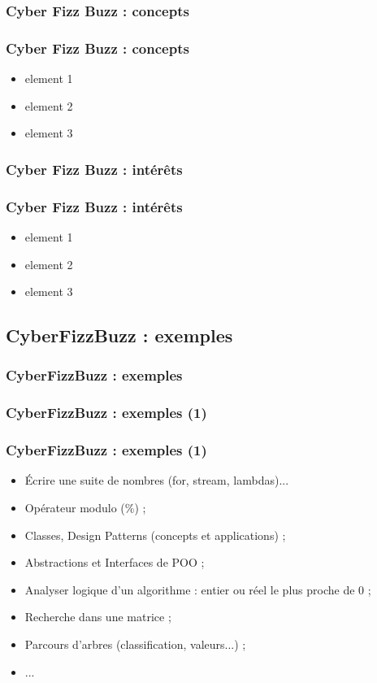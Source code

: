\documentclass[slidetop,11pt]{beamer}
\begin{document}
\subsubsection{Cyber Fizz Buzz : concepts}
\begin{frame}
	\frametitle{Cyber Fizz Buzz : concepts}
	\begin{itemize}
		\item element 1
		\item element 2
		\item element 3
	\end{itemize}
\end{frame} 

\subsubsection{Cyber Fizz Buzz : int{\'e}r{\^e}ts}
\begin{frame}
	\frametitle{Cyber Fizz Buzz : int{\'e}r{\^e}ts}
	\begin{itemize}
		\item element 1
		\item element 2
		\item element 3
	\end{itemize}
\end{frame} 

\subsection{CyberFizzBuzz : exemples}
\begin{frame}
	\frametitle{CyberFizzBuzz : exemples}
	\tableofcontents[sections=1,currentsection,subsectionstyle=show/shaded/hide]
\end{frame} 

\subsubsection{CyberFizzBuzz : exemples (1)}
\begin{frame}
	\frametitle{CyberFizzBuzz : exemples (1)}
	\begin{itemize}
		\item {\'E}crire une suite de nombres (for, stream, lambdas)...
		\item Op{\'e}rateur modulo (\%) ; 
		\item Classes, Design Patterns (concepts et applications) ; 
		\item Abstractions et Interfaces de POO ; 
		\item Analyser logique d'un algorithme : entier ou r{\'e}el le plus proche de 0 ; 
		\item Recherche dans une matrice ; 
		\item Parcours d'arbres (classification, valeurs...) ; 
		\item ... 
	\end{itemize}
\end{frame} 
\end{document}
